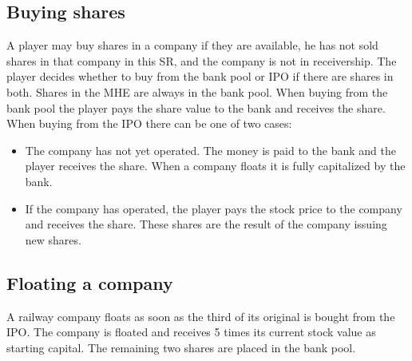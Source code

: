 \documentclass[a4paper,twocolumn]{article}
\begin{document}
\subsection{Buying shares}
A player may buy shares in a company if they are available, he has not sold
shares in that company in this SR, and the company is not in receivership. The
player decides whether to buy from the bank pool or IPO if there are shares in
both. Shares in the MHE are always in the bank pool. When buying from the bank
pool the player pays the share value to the bank and receives the share. When
buying from the IPO there can be one of two cases:
\begin{itemize}
	\item The company has not yet operated. The money is paid to the bank and
	the player receives the share. When a company floats it is fully
	capitalized by the bank.
	\item If the company has operated, the player pays the stock price to the
	company and receives the share. These shares are the result of the company
	issuing new shares.
\end{itemize}

\subsection{Floating a company}
A railway company floats as soon as the third of its original is bought from the
IPO. The company is floated and receives 5 times its current stock value as
starting capital. The remaining two shares are placed in the bank pool.
\end{document}
